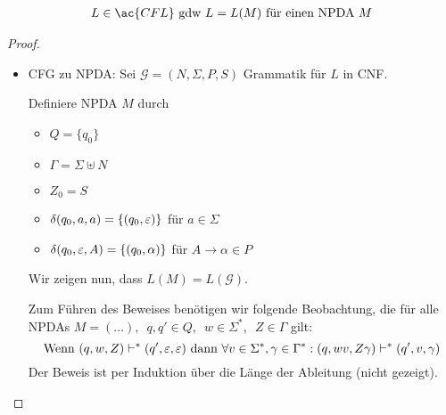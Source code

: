 \begin{Satz}\label{satz:5.1}
  \begin{align*}
		L \in \ac{CFL}  \text{ gdw } L =L(M) \text{ für einen NPDA $M$}
  \end{align*}
\end{Satz}
\begin{proof}\hfill
	\begin{itemize}
	\item CFG zu NPDA:
		Sei $\mathcal{G} = (N,\Sigma,P,S)$ Grammatik für $L$ in \ac{CNF}.
    
		Definiere \ac{NPDA} $M$ durch
		\begin{itemize}
			\item $Q = \{q_0\}$ 
			\item $\Gamma = \Sigma\uplus N$
			\item $Z_0 = S$
			\item $\delta(q_0,a,a) = \{(q_0,\varepsilon)\} $ für $ a\in\Sigma$
			\item $\delta(q_0,\varepsilon,A) = \{(q_0,\alpha)\}$ für $A\to\alpha\in P$
		\end{itemize}
  Wir zeigen nun, dass $L(M) = L(\mathcal{G})$.

  Zum Führen des Beweises benötigen wir folgende Beobachtung, die für alle NPDAs $M = (\ldots),\enspace q,q' \in Q,\enspace w \in \Sigma^*,\enspace Z \in \Gamma$ gilt:
  \begin{displaymath}
    \text{Wenn } (q,w,Z) \vdash^* (q', \varepsilon, \varepsilon) \text{ dann } \forall v \in \Sigma^*, \gamma \in \Gamma^*: (q, wv, Z\gamma) \vdash^* (q', v, \gamma)
  \end{displaymath}
  Der Beweis ist per Induktion über die Länge der Ableitung (nicht gezeigt).


\end{itemize}
\end{proof}
